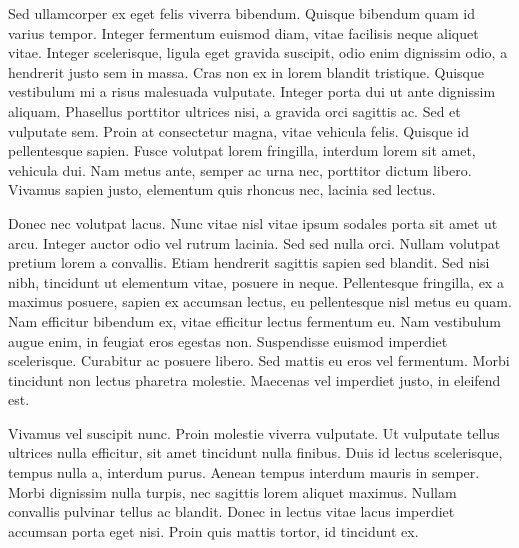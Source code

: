 \documentclass{fancy-article}
\begin{document}
\AP Sed ullamcorper ex eget felis viverra bibendum. Quisque bibendum quam id varius tempor. Integer fermentum euismod diam, vitae facilisis neque aliquet vitae. Integer scelerisque, ligula eget gravida suscipit, odio enim dignissim odio, a hendrerit justo sem in massa. Cras non ex in lorem blandit tristique. Quisque vestibulum mi a risus malesuada vulputate. Integer porta dui ut ante dignissim aliquam. Phasellus porttitor ultrices nisi, a gravida orci sagittis ac. Sed et vulputate sem. Proin at consectetur magna, vitae vehicula felis. Quisque id pellentesque sapien. Fusce volutpat lorem fringilla, interdum lorem sit amet, vehicula dui. Nam metus ante, semper ac urna nec, porttitor dictum libero. Vivamus sapien justo, elementum quis rhoncus nec, lacinia sed lectus.

\AP Donec nec volutpat lacus. Nunc vitae nisl vitae ipsum sodales porta sit amet ut arcu. Integer auctor odio vel rutrum lacinia. Sed sed nulla orci. Nullam volutpat pretium lorem a convallis. Etiam hendrerit sagittis sapien sed blandit. Sed nisi nibh, tincidunt ut elementum vitae, posuere in neque. Pellentesque fringilla, ex a maximus posuere, sapien ex accumsan lectus, eu pellentesque nisl metus eu quam. Nam efficitur bibendum ex, vitae efficitur lectus fermentum eu. Nam vestibulum augue enim, in feugiat eros egestas non. Suspendisse euismod imperdiet scelerisque. Curabitur ac posuere libero. Sed mattis eu eros vel fermentum. Morbi tincidunt non lectus pharetra molestie. Maecenas vel imperdiet justo, in eleifend est.

\AP Vivamus vel suscipit nunc. Proin molestie viverra vulputate. Ut vulputate tellus ultrices nulla efficitur, sit amet tincidunt nulla finibus. Duis id lectus scelerisque, tempus nulla a, interdum purus. Aenean tempus interdum mauris in semper. Morbi dignissim nulla turpis, nec sagittis lorem aliquet maximus. Nullam convallis pulvinar tellus ac blandit. Donec in lectus vitae lacus imperdiet accumsan porta eget nisi. Proin quis mattis tortor, id tincidunt ex.



\end{document}
